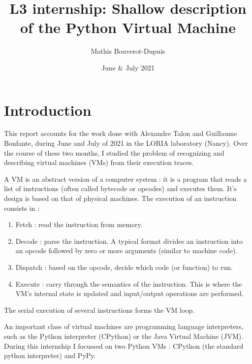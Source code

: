 \documentclass[french]{article}
\begin{document}
	\title{L3 internship: Shallow description of the Python Virtual Machine}
	\author{Mathis Bouverot-Dupuis}
	\date{June \& July 2021}
	
	\maketitle 
	
	\tableofcontents
	\newpage

\section{Introduction}
This report accounts for the work done with Alexandre Talon and Guillaume Bonfante, during June and July of 2021 in the LORIA laboratory (Nancy). Over the course of these two months, I studied the problem of recognizing and describing virtual machines (VMs) from their execution traces.

A VM is an abstract version of a computer system : it is a program that reads a list of instructions (often called bytecode or opcodes) and executes them. It's design is based on that of physical machines. The execution of an instruction consists in :
\begin{enumerate}
	\item Fetch : read the instruction from memory.
	\item Decode : parse the instruction. A typical format divides an instruction into an opcode followed by zero or more arguments (similar to machine code).
	\item Dispatch : based on the opcode, decide which code (or function) to run.
	\item Execute : carry through the semantics of the instruction. This is where the VM's internal state is updated and input/output operations are performed.
\end{enumerate}
The serial execution of several instructions forms the VM loop.


An important class of virtual machines are programming language interpreters, such as the Python interpreter (CPython) or the Java Virtual Machine (JVM). During this internship I focussed on two Python VMs : CPython (the standard python interpreter) and PyPy. 


\end{document}
